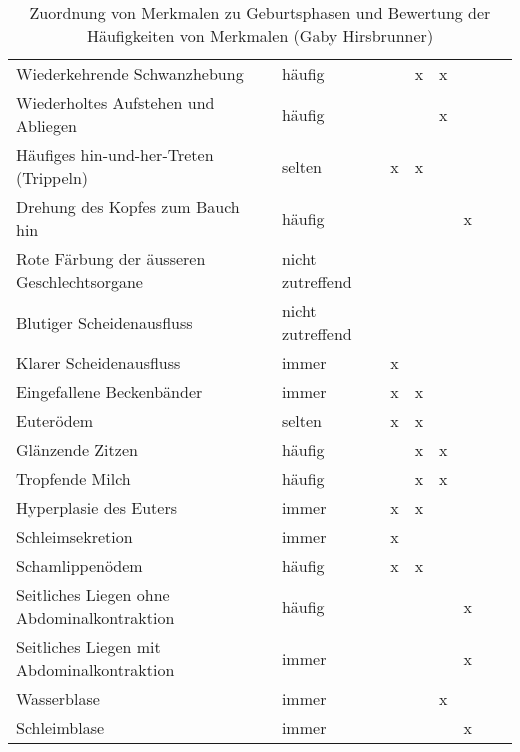 \begin{landscape}
\begin{table}[h]
\begin{tabular}{  p{8.5cm}  l*{6}{l}}
Wiederkehrende Schwanzhebung & häufig &  & x & x &  &  \\ 
Wiederholtes Aufstehen und Abliegen & häufig &  &  & x &  &  \\ 
Häufiges hin-und-her-Treten (Trippeln) & selten & x & x &  &  &  \\ 
Drehung des Kopfes zum Bauch hin & häufig &  &  &  & x &  \\ 
Rote Färbung der äusseren Geschlechtsorgane & nicht zutreffend &  &  &  &  &  \\ 
Blutiger Scheidenausfluss & nicht zutreffend &  &  &  &  &  \\ 
Klarer Scheidenausfluss & immer & x &  &  &  &  \\ 
Eingefallene Beckenbänder & immer & x & x &  &  &  \\ 
Euterödem & selten & x & x &  &  &  \\ 
Glänzende Zitzen & häufig &  & x & x &  &  \\ 
Tropfende Milch & häufig &  & x & x &  &  \\ 
Hyperplasie des Euters & immer & x & x &  &  &  \\ 
Schleimsekretion & immer & x &  &  &  &  \\ 
Schamlippenödem & häufig & x & x &  &  &  \\ 
Seitliches Liegen ohne Abdominalkontraktion & häufig &  &  &  & x &  \\ 
Seitliches Liegen mit Abdominalkontraktion & immer &  &  &  & x &  \\ 
Wasserblase & immer &  &  & x &  &  \\ 
Schleimblase & immer &  &  &  & x &  \\
		\bottomrule
		
	\end{tabular}
	\caption{Zuordnung von Merkmalen zu Geburtsphasen und Bewertung der Häufigkeiten von Merkmalen (Gaby Hirsbrunner) }
	\label{tab: Zuordnung und Bewertung der Häufigkeiten von Merkmalen (Gaby Hirsbrunner)}
\end{table}




\end{landscape}
\restoregeometry %




